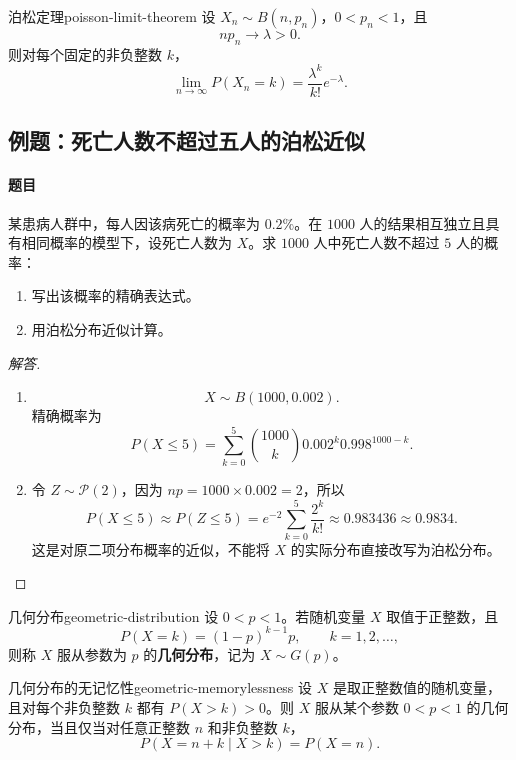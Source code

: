 \begin{mytheorem}{泊松定理}{poisson-limit-theorem}
设 $X_n\sim B(n,p_n)$，$0<p_n<1$，且
\[
np_n\longrightarrow\lambda>0.
\]
则对每个固定的非负整数 $k$，
\[
\lim_{n\to\infty}P(X_n=k)=\frac{\lambda^k}{k!}e^{-\lambda}.
\]
\end{mytheorem}

\subsection{例题：死亡人数不超过五人的泊松近似}\label{note:c2:e8}
\paragraph{题目}
某患病人群中，每人因该病死亡的概率为 $0.2\%$。在 $1000$ 人的结果相互独立且具有相同概率的模型下，设死亡人数为 $X$。求 $1000$ 人中死亡人数不超过 $5$ 人的概率：
\begin{enumerate}
\item 写出该概率的精确表达式。
\item 用泊松分布近似计算。
\end{enumerate}

\begin{proof}[解答]
\begin{enumerate}
\item \[
X\sim B(1000,0.002).
\]
精确概率为
\[
P(X\leq5)
=\sum_{k=0}^{5}\binom{1000}{k}0.002^k0.998^{1000-k}.
\]
\item 令 $Z\sim\mathcal P(2)$，因为 $np=1000\times0.002=2$，所以
\[
P(X\leq5)\approx P(Z\leq5)
=e^{-2}\sum_{k=0}^{5}\frac{2^k}{k!}
\approx0.983436\approx0.9834.
\]
这是对原二项分布概率的近似，不能将 $X$ 的实际分布直接改写为泊松分布。
\end{enumerate}
\end{proof}

\begin{mydefinition}{几何分布}{geometric-distribution}
设 $0<p<1$。若随机变量 $X$ 取值于正整数，且
\[
P(X=k)=(1-p)^{k-1}p,\qquad k=1,2,\ldots,
\]
则称 $X$ 服从参数为 $p$ 的\textbf{几何分布}，记为 $X\sim G(p)$。
\end{mydefinition}

\begin{mytheorem}{几何分布的无记忆性}{geometric-memorylessness}
设 $X$ 是取正整数值的随机变量，且对每个非负整数 $k$ 都有 $P(X>k)>0$。则 $X$ 服从某个参数 $0<p<1$ 的几何分布，当且仅当对任意正整数 $n$ 和非负整数 $k$，
\[
P(X=n+k\mid X>k)=P(X=n).
\]
\end{mytheorem}

